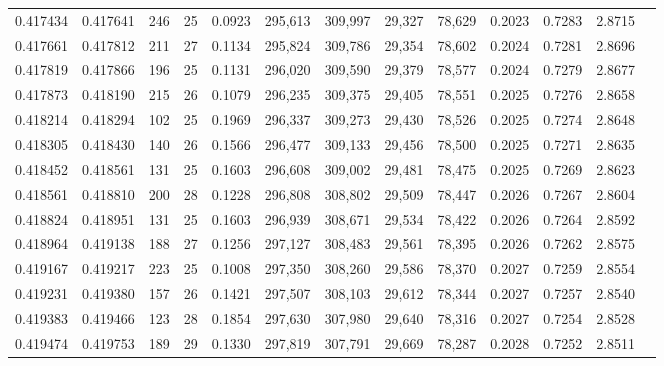 \begin{tabular}{rrrrrrrrrrrrr}
0.417434 & 0.417641 &    246 &    25 &                                     0.0923 & 295,613 & 309,997 &  29,327 &  78,629 & 0.2023 & 0.7283 & 2.8715 \\
0.417661 & 0.417812 &    211 &    27 &                                     0.1134 & 295,824 & 309,786 &  29,354 &  78,602 & 0.2024 & 0.7281 & 2.8696 \\
0.417819 & 0.417866 &    196 &    25 &                                     0.1131 & 296,020 & 309,590 &  29,379 &  78,577 & 0.2024 & 0.7279 & 2.8677 \\
0.417873 & 0.418190 &    215 &    26 &                                     0.1079 & 296,235 & 309,375 &  29,405 &  78,551 & 0.2025 & 0.7276 & 2.8658 \\
0.418214 & 0.418294 &    102 &    25 &                                     0.1969 & 296,337 & 309,273 &  29,430 &  78,526 & 0.2025 & 0.7274 & 2.8648 \\
0.418305 & 0.418430 &    140 &    26 &                                     0.1566 & 296,477 & 309,133 &  29,456 &  78,500 & 0.2025 & 0.7271 & 2.8635 \\
0.418452 & 0.418561 &    131 &    25 &                                     0.1603 & 296,608 & 309,002 &  29,481 &  78,475 & 0.2025 & 0.7269 & 2.8623 \\
0.418561 & 0.418810 &    200 &    28 &                                     0.1228 & 296,808 & 308,802 &  29,509 &  78,447 & 0.2026 & 0.7267 & 2.8604 \\
0.418824 & 0.418951 &    131 &    25 &                                     0.1603 & 296,939 & 308,671 &  29,534 &  78,422 & 0.2026 & 0.7264 & 2.8592 \\
0.418964 & 0.419138 &    188 &    27 &                                     0.1256 & 297,127 & 308,483 &  29,561 &  78,395 & 0.2026 & 0.7262 & 2.8575 \\
0.419167 & 0.419217 &    223 &    25 &                                     0.1008 & 297,350 & 308,260 &  29,586 &  78,370 & 0.2027 & 0.7259 & 2.8554 \\
0.419231 & 0.419380 &    157 &    26 &                                     0.1421 & 297,507 & 308,103 &  29,612 &  78,344 & 0.2027 & 0.7257 & 2.8540 \\
0.419383 & 0.419466 &    123 &    28 &                                     0.1854 & 297,630 & 307,980 &  29,640 &  78,316 & 0.2027 & 0.7254 & 2.8528 \\
0.419474 & 0.419753 &    189 &    29 &                                     0.1330 & 297,819 & 307,791 &  29,669 &  78,287 & 0.2028 & 0.7252 & 2.8511 \\

\end{tabular}
